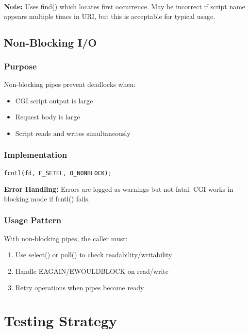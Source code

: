 \documentclass[11pt,a4paper]{article}
\begin{document}
\textbf{Note:} Uses find() which locates first occurrence. May be incorrect if script name appears multiple times in URI, but this is acceptable for typical usage.

\subsection{Non-Blocking I/O}

\subsubsection{Purpose}

Non-blocking pipes prevent deadlocks when:
\begin{itemize}
    \item CGI script output is large
    \item Request body is large
    \item Script reads and writes simultaneously
\end{itemize}

\subsubsection{Implementation}

\begin{lstlisting}[caption=Non-Blocking Configuration]
fcntl(fd, F_SETFL, O_NONBLOCK);
\end{lstlisting}

\textbf{Error Handling:} Errors are logged as warnings but not fatal. CGI works in blocking mode if fcntl() fails.

\subsubsection{Usage Pattern}

With non-blocking pipes, the caller must:
\begin{enumerate}
    \item Use select() or poll() to check readability/writability
    \item Handle EAGAIN/EWOULDBLOCK on read/write
    \item Retry operations when pipes become ready
\end{enumerate}

\newpage
\section{Testing Strategy}
\end{document}
